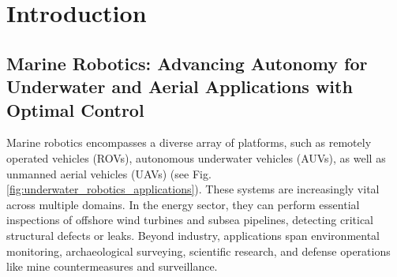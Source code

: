 \chapter{Introduction}















\section{Marine Robotics: Advancing Autonomy for Underwater and Aerial Applications with Optimal Control}

Marine robotics encompasses a diverse array of platforms, such as remotely operated vehicles (ROVs), autonomous underwater vehicles (AUVs), as well as unmanned aerial vehicles (UAVs) (see Fig. \ref{fig:underwater_robotics_applications}). These systems are increasingly vital across multiple domains. In the energy sector, they can perform essential inspections of offshore wind turbines and subsea pipelines, detecting critical structural defects or leaks. Beyond industry, applications span environmental monitoring, archaeological surveying, scientific research, and defense operations like mine countermeasures and surveillance.


